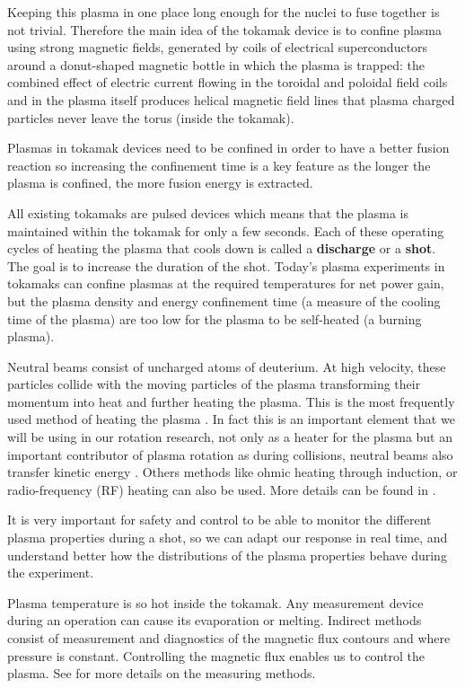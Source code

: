 \documentclass[12pt,lot, lof]{puthesis}
\begin{document}
Keeping this plasma in one place long enough for the nuclei to fuse together is not trivial. Therefore the main idea of the tokamak device is to confine plasma using strong magnetic fields, generated by coils of electrical superconductors around a donut-shaped magnetic bottle in which the plasma is trapped: the combined effect of electric current flowing in the toroidal and poloidal field coils and in the plasma itself produces helical magnetic field lines that plasma charged particles never leave the torus (inside the tokamak).

Plasmas in tokamak devices need to be confined in order to have a better fusion reaction so increasing the confinement time is a key feature as the longer the plasma is confined, the more fusion energy is extracted. 

All existing tokamaks are pulsed devices which means that the plasma is maintained within the tokamak for only a few seconds. Each of these operating cycles of heating the plasma that cools down is called a \textbf{discharge} or a \textbf{shot}. The goal is to increase the duration of the shot. Today's plasma experiments in tokamaks can confine plasmas at the required temperatures for net power gain, but the plasma density and energy confinement time (a measure of the cooling time of the plasma) are too low for the plasma to be self-heated (a burning plasma).

Neutral beams consist of uncharged atoms of deuterium. At high velocity, these particles collide with the moving particles of the plasma transforming their momentum into heat and further heating the plasma. This is the most frequently used method of heating the plasma \cite{Stix72, Wagner82, Kaye85, Strachan87}. In fact this is an important element that we will be using in our rotation research, not only as a heater for the plasma but an important contributor of plasma rotation as during collisions, neutral beams also transfer kinetic energy \cite{Suckewer79, Suckewer81, Strait07}. Others methods like ohmic heating through induction, or radio-frequency (RF) heating can also be used. More details can be found in \cite{Stix75, Fisch78, Kubo83, Goldston84}. 

It is very important for safety and control to be able to monitor the different plasma properties during a shot, so we can adapt our response in real time, and understand better how the distributions of the plasma properties behave during the experiment.

Plasma temperature is so hot inside the tokamak. Any measurement device during an operation can cause its evaporation or melting.
Indirect methods consist of measurement and diagnostics of the magnetic flux contours and where pressure is constant. Controlling  the magnetic flux enables us to control the plasma. See \cite{Equipe78, Orlinskij88, Matthews94, McKee99, Hutchinson02} for more details on the measuring methods.
\end{document}
